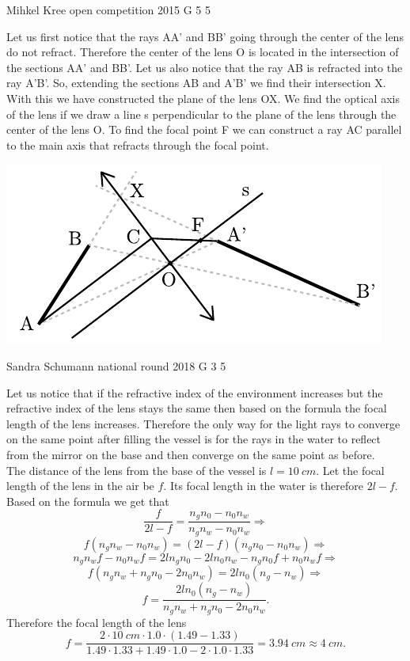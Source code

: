 \documentclass[11pt]{article}
\begin{document}
{Mihkel Kree} %
{open competition} %
{2015} %
{G 5} %
{5} %
{

\ifEngSolution
Let us first notice that the rays AA’ and BB’ going through the center of the lens do not refract. Therefore the center of the lens O is located in the intersection of the sections AA’ and BB’. Let us also notice that the ray AB is refracted into the ray A’B’. So, extending the sections AB and A’B’ we find their intersection X. With this we have constructed the plane of the lens OX. We find the optical axis of the lens if we draw a line s perpendicular to the plane of the lens through the center of the lens O. To find the focal point F we can construct a ray AC parallel to the main axis that refracts through the focal point. 
\begin{center}
\includegraphics[width=\textwidth]{2015-lahg-05-laatsLahendus}
\end{center}
\fi
}

{Sandra Schumann} %
{national round} %
{2018} %
{G 3} %
{5} %
{

\ifEngSolution
Let us notice that if the refractive index of the environment increases but the refractive index of the lens stays the same then based on the formula the focal length of the lens increases. Therefore the only way for the light rays to converge on the same point after filling the vessel is for the rays in the water to reflect from the mirror on the base and then converge on the same point as before.\\
The distance of the lens from the base of the vessel is $l = \SI{10}{cm}$. Let the focal length of the lens in the air be $f$. Its focal length in the water is therefore $2l-f$. Based on the formula we get that
\[ \frac{f}{2l-f} = \frac{n_g n_0 - n_0 n_w}{n_g n_w - n_0 n_w}\Rightarrow \] 
\[ f(n_g n_w - n_0 n_w) = (2l-f)(n_g n_0 - n_0 n_w)\Rightarrow \]
\[ n_g n_w f - n_0 n_w f = 2l n_g n_0 - 2l n_0 n_w - n_g n_0 f + n_0 n_w f\Rightarrow \]
\[ f (n_g n_w + n_g n_0 - 2 n_0 n_w) = 2l n_0 (n_g - n_w)\Rightarrow \]
\[ f = \frac{2l n_0 (n_g - n_w)}{n_g n_w + n_g n_0 - 2 n_0 n_w}. \]
Therefore the focal length of the lens
\[ f = \frac{\num{2} \cdot \SI{10}{cm} \cdot \num{1,0} \cdot (\num{1,49} - \num{1,33})}{\num{1,49}
\cdot \num{1,33} + \num{1,49} \cdot \num{1,0} - \num{2} \cdot \num{1,0} \cdot \num{1,33}} = \SI{3,94}{cm}
\approx \SI{4}{cm}. \]
\fi
}
\end{document}
